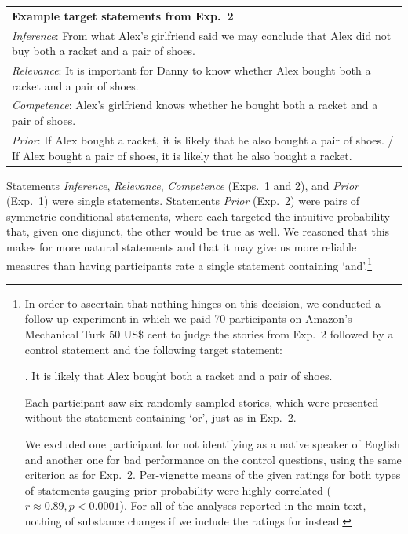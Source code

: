 \documentclass[12pt]{article}
\begin{document}
\begin{center}
\begin{tabular}{p{10cm}}
\textbf{Example target statements from Exp.\ 2}\\[0.2cm]
  \emph{Inference}: From what Alex's girlfriend said we may conclude that Alex did not buy both a racket and a
  pair of shoes.\\[.2cm]
  \emph{Relevance}: It is important for Danny to know whether Alex bought both a racket and a
  pair of shoes.\\[.2cm]
  \emph{Competence}: Alex's girlfriend knows whether he bought both a racket and a pair of shoes. \\[.2cm]
  \emph{Prior}: If Alex bought a racket, it is likely that he also bought a pair of shoes. / If Alex bought a pair of shoes, it is likely that he also bought a racket.
\end{tabular}
\end{center}

\noindent Statements \emph{Inference}, \emph{Relevance}, \emph{Competence} (Exps.\ 1 and 2), and \emph{Prior}  (Exp.\ 1) were single statements. Statements \emph{Prior} (Exp.\ 2) were pairs of symmetric conditional statements, where each targeted the intuitive probability that, given one disjunct, the other would be true as well. We reasoned that this makes for more natural statements and that it may give us more reliable measures than having participants rate a single statement containing `and'.\footnote{In order to ascertain that nothing hinges on this decision, we conducted a follow-up experiment in which we paid 70 participants on Amazon's Mechanical Turk 50 US\$ cent to judge the stories from Exp.\ 2 followed by a control statement and the following target statement:

\ex.	It is likely that Alex bought both a racket and a pair of shoes.

Each participant saw six randomly sampled stories, which were presented without the statement containing `or', just as in Exp.\ 2.

We excluded one participant for not identifying as a native speaker of English and another one for bad performance on the control questions, using the same criterion as for
Exp.\ 2. Per-vignette means of the given ratings for both types of statements gauging prior probability were highly correlated ($r \approx 0.89, p < 0.0001$). For all of the analyses reported in the main text, nothing of substance changes if we include the ratings for \Last instead.}
\end{document}

